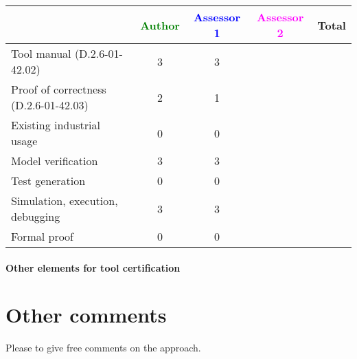 \begin{tabular}{|l | c | c | c | c|}
\hline
& \textcolor{green}{Author} & \textcolor{blue}{Assessor 1} & \textcolor{magenta}{Assessor 2} & Total \\
\hline 
Tool manual (D.2.6-01-42.02) & 3 & 3 & &  \\
\hline
Proof of correctness (D.2.6-01-42.03) & 2 & 1 & & \\
\hline
Existing industrial  usage &  0 & 0 & & \\
\hline
Model verification & 3 & 3 & & \\
\hline
Test generation & 0 & 0 & & \\
\hline
Simulation, execution, debugging & 3 & 3 & & \\
\hline
Formal proof & 0 & 0 & & \\
\hline
\end{tabular}

\paragraph{Other elements for tool certification}

\section{Other comments}
Please to  give free comments on the approach.

